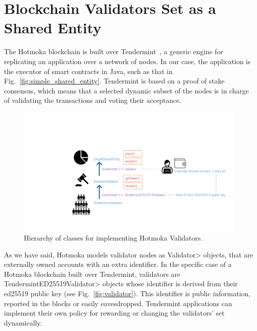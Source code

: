 \section{Blockchain Validators Set as a Shared Entity}\label{sec:validators}

The Hotmoka blockchain is built over Tendermint~\cite{Kwon14}, a
generic engine for replicating an application over a network of nodes. In our case,
the application is the executor of smart contracts in Java, such as that in
Fig.~\ref{fig:simple_shared_entity}. Tendermint is based on a proof of stake
consensus, which means that a selected dynamic subset of the nodes is in charge of
validating the transactions and voting their acceptance. 
%
\begin{figure}[ht]
\centering
\includegraphics[width=.9\linewidth]{figures/takamaka_validators}
\caption{Hierarchy of classes for implementing Hotmoka Validators.}
\label{figure.takamaka_validators}
\end{figure}
%
As we have said,
Hotmoka models validator nodes as \<Validator> objects, that are externally owned accounts
with an extra identifier. In the specific case of a Hotmoka blockchain built over Tendermint,
validators are \<TendermintED25519Validator> objects whose
identifier is derived from their ed25519 public key (see Fig.~\ref{fig:validator}).
This identifier is public information, reported in the blocks or easily eavesdropped.
Tendermint applications can implement their own
policy for rewarding or changing the validators' set dynamically.



